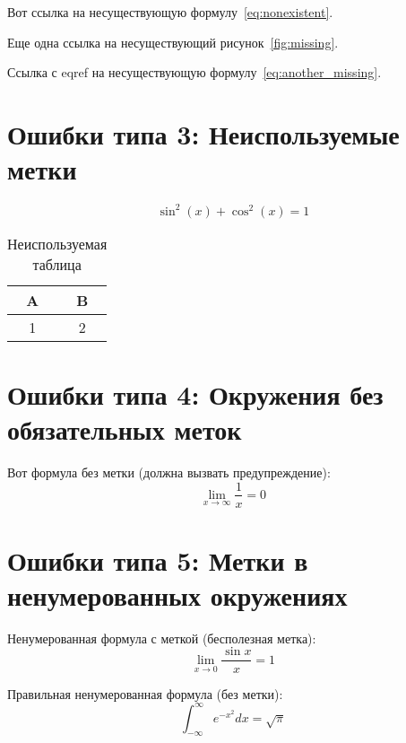 \documentclass{article}
\begin{document}
Вот ссылка на несуществующую формулу~\ref{eq:nonexistent}. %

Еще одна ссылка на несуществующий рисунок~\ref{fig:missing}. %

Ссылка с eqref на несуществующую формулу~\eqref{eq:another_missing}. %

\section{Ошибки типа 3: Неиспользуемые метки}

\begin{equation}
    \sin^2(x) + \cos^2(x) = 1
    \label{eq:unused_formula}  %
\end{equation}

\begin{table}[h]
    \centering
    \begin{tabular}{|c|c|}
        \hline
        A & B \\
        \hline
        1 & 2 \\
        \hline
    \end{tabular}
    \caption{Неиспользуемая таблица}
    \label{tab:unused_table}  %
\end{table}

\section{Ошибки типа 4: Окружения без обязательных меток}

Вот формула без метки (должна вызвать предупреждение):
\begin{equation}
    \lim_{x \to \infty} \frac{1}{x} = 0
\end{equation}

\section{Ошибки типа 5: Метки в ненумерованных окружениях}

Ненумерованная формула с меткой (бесполезная метка):
\begin{equation*}
    \lim_{x \to 0} \frac{\sin x}{x} = 1
    \label{eq:useless_label}  %
\end{equation*}

Правильная ненумерованная формула (без метки):
\begin{equation*}
    \int_{-\infty}^{\infty} e^{-x^2} dx = \sqrt{\pi}
\end{equation*}
\end{document}
